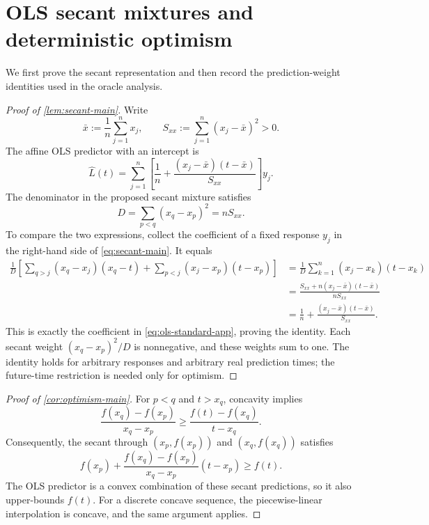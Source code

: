 \documentclass[11pt]{article}
\theoremstyle{remark}
\begin{document}
\clearpage
\appendix
{}
\section{OLS secant mixtures and deterministic optimism}\label{app:ols}

We first prove the secant representation and then record the prediction-weight
identities used in the oracle analysis.

\begin{proof}[Proof of \cref{lem:secant-main}]
Write
\[
\bar x:=\frac1n\sum_{j=1}^n x_j,
\qquad
S_{xx}:=\sum_{j=1}^n(x_j-\bar x)^2>0.
\]
The affine OLS predictor with an intercept is
\begin{equation}\label{eq:ols-standard-app}
\widehat L(t)
=\sum_{j=1}^n
\left[\frac1n+
\frac{(x_j-\bar x)(t-\bar x)}{S_{xx}}\right]y_j.
\end{equation}
The denominator in the proposed secant mixture satisfies
\begin{equation}\label{eq:pair-x-app}
D=\sum_{p<q}(x_q-x_p)^2=nS_{xx}.
\end{equation}
To compare the two expressions, collect the coefficient of a fixed response
$y_j$ in the right-hand side of \eqref{eq:secant-main}. It equals
\begin{align*}
\frac1D\left[
\sum_{q>j}(x_q-x_j)(x_q-t)
+\sum_{p<j}(x_j-x_p)(t-x_p)
\right]
&=\frac1D\sum_{k=1}^n(x_j-x_k)(t-x_k)\\
&=\frac{S_{xx}+n(x_j-\bar x)(t-\bar x)}{nS_{xx}}\\
&=\frac1n+\frac{(x_j-\bar x)(t-\bar x)}{S_{xx}}.
\end{align*}
This is exactly the coefficient in \eqref{eq:ols-standard-app}, proving the
identity. Each secant weight $(x_q-x_p)^2/D$ is nonnegative, and these weights
sum to one. The identity holds for arbitrary responses and arbitrary real
prediction times; the future-time restriction is needed only for optimism.
\end{proof}

\begin{proof}[Proof of \cref{cor:optimism-main}]
For $p<q$ and $t>x_q$, concavity implies
\[
\frac{f(x_q)-f(x_p)}{x_q-x_p}
\ge
\frac{f(t)-f(x_q)}{t-x_q}.
\]
Consequently, the secant through $(x_p,f(x_p))$ and $(x_q,f(x_q))$ satisfies
\[
f(x_p)+\frac{f(x_q)-f(x_p)}{x_q-x_p}(t-x_p)
\ge f(t).
\]
The OLS predictor is a convex combination of these secant predictions, so it
also upper-bounds $f(t)$. For a discrete concave sequence, the piecewise-linear
interpolation is concave, and the same argument applies.
\end{proof}
\end{document}
